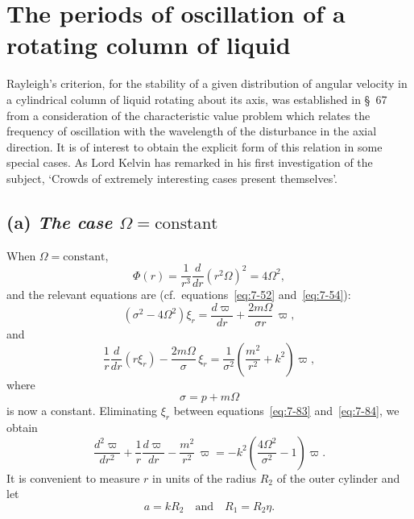 \section{The periods of oscillation of a rotating column of liquid}
\label{sec:7-68}
Rayleigh's criterion, for the stability of a given distribution of angular
velocity in a cylindrical column of liquid rotating about its axis, was
established in \S~67 from a consideration of the characteristic value problem which relates the frequency of oscillation with the wavelength of
the disturbance in the axial direction.  It is of interest to obtain the
explicit form of this relation in some special cases.  As Lord Kelvin has
remarked in his first investigation of the subject, `Crowds of extremely
interesting cases present themselves'.

\subsection*{(a) \emph{The case $\Omega = \text{constant}$}}
When $\Omega = \text{constant}$,
\begin{equation}
\label{eq:7-82}
\Phi(r) = \frac{1}{r^3}\frac{d}{dr}(r^2\Omega)^2 = 4\Omega^2,
\end{equation}
and the relevant equations are (cf.\ equations~\eqref{eq:7-52} and~\eqref{eq:7-54}):
\begin{equation}
\label{eq:7-83}
(\sigma^2 - 4\Omega^2)\xi_r = \frac{d\varpi}{dr}
+ \frac{2m\Omega}{\sigma r}\,\varpi,
\end{equation}
and
\begin{equation}
\label{eq:7-84}
\frac{1}{r}\frac{d}{dr}(r\xi_r)
- \frac{2m\Omega}{\sigma}\,\xi_r
= \frac{1}{\sigma^2}\!\left(\frac{m^2}{r^2}+k^2\right)\varpi,
\end{equation}
where
\begin{equation}
\label{eq:7-85}
\sigma = p + m\Omega
\end{equation}
is now a constant.  Eliminating $\xi_r$ between equations~\eqref{eq:7-83} and~\eqref{eq:7-84}, we
obtain
\begin{equation}
\label{eq:7-86}
\frac{d^2\varpi}{dr^2}+\frac{1}{r}\frac{d\varpi}{dr}
- \frac{m^2}{r^2}\,\varpi
= -k^2\!\left(\frac{4\Omega^2}{\sigma^2}-1\right)\varpi.
\end{equation}
It is convenient to measure $r$ in units of the radius $R_2$ of the outer
cylinder and let
\begin{equation}
\label{eq:7-87}
a = kR_2 \quad \text{and} \quad R_1 = R_2\eta.
\end{equation}
